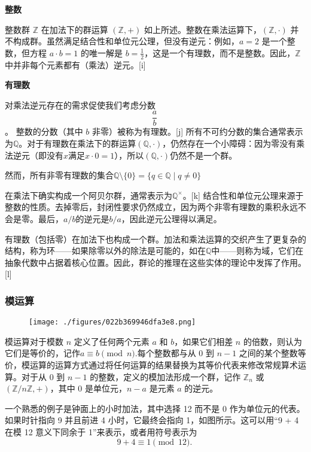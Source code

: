 \textbf{整数}  

整数群 \( \mathbb{Z} \) 在加法下的群运算 \( (\mathbb{Z}, +) \) 如上所述。整数在乘法运算下，\( (\mathbb{Z}, \cdot) \) 并不构成群。虽然满足结合性和单位元公理，但没有逆元：例如，\( a = 2 \) 是一个整数，但方程 \( a \cdot b = 1 \) 的唯一解是 \( b = \frac{1}{2} \)，这是一个有理数，而不是整数。因此，\( \mathbb{Z} \) 中并非每个元素都有（乘法）逆元。[i]

\textbf{有理数}  

对乘法逆元存在的需求促使我们考虑分数
\[\frac{a}{b}~\]。  
整数的分数（其中 \( b \) 非零）被称为有理数。[j] 所有不可约分数的集合通常表示为\( \mathbb{Q}\)。对于有理数在乘法下的群运算\( (\mathbb{Q}, \cdot)\)，仍然存在一个小障碍：因为零没有乘法逆元（即没有\( x \)满足\( x \cdot 0 = 1 \)），所以\( (\mathbb{Q}, \cdot)\)仍然不是一个群。

然而，所有非零有理数的集合\(\mathbb{Q} \setminus \{0\} = \{q \in \mathbb{Q} \mid q \neq 0\}\)

在乘法下确实构成一个阿贝尔群，通常表示为\( \mathbb{Q}^\times \)。[k] 结合性和单位元公理来源于整数的性质。去掉零后，封闭性要求仍然成立，因为两个非零有理数的乘积永远不会是零。最后，\( a/b \)的逆元是\(b/a\)，因此逆元公理得以满足。

有理数（包括零）在加法下也构成一个群。加法和乘法运算的交织产生了更复杂的结构，称为环——如果除零以外的除法是可能的，如在\(\mathbb{Q}\)中——则称为域，它们在抽象代数中占据着核心位置。因此，群论的推理在这些实体的理论中发挥了作用。[l]
\subsubsection{模运算}
\begin{figure}[ht]
\centering
\texttt{[image: ./figures/022b369946dfa3e8.png]}
\caption{} \label{fig_GroupM_5}
\end{figure}
模运算对于模数 \( n \) 定义了任何两个元素 \( a \) 和 \( b \)，如果它们相差 \( n \) 的倍数，则认为它们是等价的，记作\(a \equiv b \pmod{n}\).每个整数都与从 0 到 \( n - 1 \) 之间的某个整数等价，模运算的运算方式通过将任何运算的结果替换为其等价代表来修改常规算术运算。对于从 0 到 \( n - 1 \) 的整数，定义的模加法形成一个群，记作 \( \mathbb{Z}_n \) 或 \( (\mathbb{Z}/n\mathbb{Z}, +) \)，其中 0 是单位元，\( n - a \) 是元素 \( a \) 的逆元。

一个熟悉的例子是钟面上的小时加法，其中选择 12 而不是 0 作为单位元的代表。如果时针指向 9 并且前进 4 小时，它最终会指向 1，如图所示。这可以用“9 + 4 在模 12 意义下同余于 1”来表示，或者用符号表示为  
\[
9 + 4 \equiv 1 \pmod{12}.~
\]